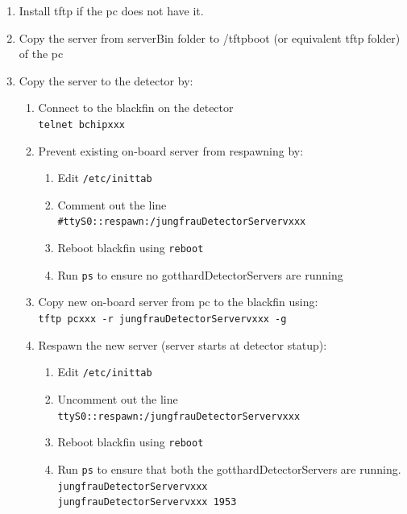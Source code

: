 \documentclass{article}
\begin{document}
\begin{enumerate}
  \item Install tftp if the pc does not have it.
  \item Copy the server from serverBin folder to /tftpboot (or equivalent tftp
folder) of the pc
  \item Copy the server to the detector by:
  \begin{enumerate}
    \item Connect to the blackfin on the detector\\ 
\verb=telnet bchipxxx=
    \item Prevent existing on-board server from respawning by:
    \begin{enumerate}
      \item Edit \verb=/etc/inittab= 
      \item Comment out the line
\verb=#ttyS0::respawn:/jungfrauDetectorServervxxx= 
      \item Reboot blackfin using \verb=reboot=
      \item Run \verb=ps= to ensure no gotthardDetectorServers are running
    \end{enumerate}
    \item Copy new on-board server from pc to the blackfin using: \\
\verb=tftp pcxxx -r jungfrauDetectorServervxxx -g= 
    \item Respawn the new server (server starts at detector statup): 
    \begin{enumerate}
      \item Edit \verb=/etc/inittab= 
      \item Uncomment out the line
\verb=ttyS0::respawn:/jungfrauDetectorServervxxx= 
      \item Reboot blackfin using \verb=reboot=
      \item Run \verb=ps= to ensure that both the gotthardDetectorServers are
running.\\
\verb=jungfrauDetectorServervxxx= \\
\verb=jungfrauDetectorServervxxx 1953=
    \end{enumerate}
  \end{enumerate}
\end{enumerate}
\end{document}
